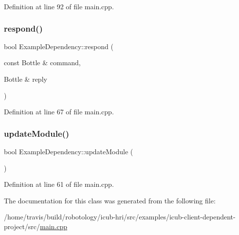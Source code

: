 Definition at line 92 of file main.\+cpp.

\mbox{\label{classExampleDependency_a3203a6f3036bb65a84dde233a0c693bb}} 
\subsubsection{\texorpdfstring{respond()}{respond()}}
{\footnotesize\ttfamily bool Example\+Dependency\+::respond (\begin{DoxyParamCaption}\item[{const Bottle \&}]{command,  }\item[{Bottle \&}]{reply }\end{DoxyParamCaption})\hspace{0.3cm}{\ttfamily [inline]}}



Definition at line 67 of file main.\+cpp.

\mbox{\label{classExampleDependency_a9f360c6aef8a3ed125e9e39588f3dd63}} 
\subsubsection{\texorpdfstring{update\+Module()}{updateModule()}}
{\footnotesize\ttfamily bool Example\+Dependency\+::update\+Module (\begin{DoxyParamCaption}{ }\end{DoxyParamCaption})\hspace{0.3cm}{\ttfamily [inline]}}



Definition at line 61 of file main.\+cpp.



The documentation for this class was generated from the following file\+:\begin{DoxyCompactItemize}
\item 
/home/travis/build/robotology/icub-\/hri/src/examples/icub-\/client-\/dependent-\/project/src/\hyperlink{examples_2icub-client-dependent-project_2src_2main_8cpp}{main.\+cpp}\end{DoxyCompactItemize}

